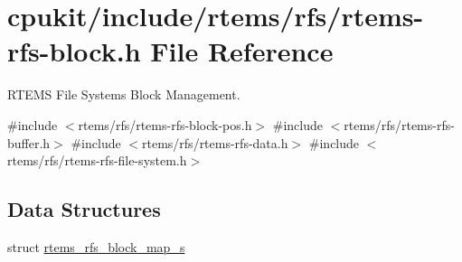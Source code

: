 \hypertarget{rtems-rfs-block_8h}{}\section{cpukit/include/rtems/rfs/rtems-\/rfs-\/block.h File Reference}
\label{rtems-rfs-block_8h}


R\+T\+E\+MS File Systems Block Management.  


{\ttfamily \#include $<$rtems/rfs/rtems-\/rfs-\/block-\/pos.\+h$>$}\newline
{\ttfamily \#include $<$rtems/rfs/rtems-\/rfs-\/buffer.\+h$>$}\newline
{\ttfamily \#include $<$rtems/rfs/rtems-\/rfs-\/data.\+h$>$}\newline
{\ttfamily \#include $<$rtems/rfs/rtems-\/rfs-\/file-\/system.\+h$>$}\newline
\subsection*{Data Structures}
\begin{DoxyCompactItemize}
\item 
struct \mbox{\hyperlink{structrtems__rfs__block__map__s}{rtems\+\_\+rfs\+\_\+block\+\_\+map\+\_\+s}}
\end{DoxyCompactItemize}

